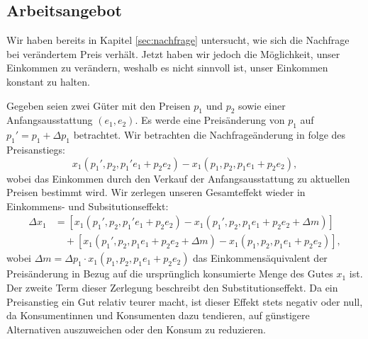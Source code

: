 \subsection{Arbeitsangebot}

Wir haben bereits in Kapitel \ref{sec:nachfrage} untersucht, wie sich die Nachfrage bei verändertem Preis verhält.
Jetzt haben wir jedoch die Möglichkeit, unser Einkommen zu verändern, weshalb es nicht sinnvoll ist, unser Einkommen konstant zu halten.

Gegeben seien zwei Güter mit den Preisen \(p_1\) und \(p_2\) sowie einer Anfangsausstattung \((e_1, e_2)\).
Es werde eine Preisänderung von \(p_1\) auf \(p_1' = p_1 + \Delta p_1\) betrachtet.
Wir betrachten die Nachfrageänderung in folge des Preisanstiegs:
\[
	x_1(p_1', p_2, p_1' e_1 + p_2 e_2) - x_1(p_1, p_2, p_1 e_1 + p_2 e_2),
\]
wobei das Einkommen durch den Verkauf der Anfangsausstattung zu aktuellen Preisen bestimmt wird.
Wir zerlegen unseren Gesamteffekt wieder in Einkommens- und Subsitutionseffekt:
\begin{align*}
	\Delta x_1 & = \left[x_1(p_1', p_2, p_1' e_1 + p_2 e_2) - x_1(p_1', p_2, p_1 e_1 + p_2 e_2 + \Delta m)\right]      \\
	           & \quad + \left[x_1(p_1', p_2, p_1 e_1 + p_2 e_2 + \Delta m) - x_1(p_1, p_2, p_1 e_1 + p_2 e_2)\right],
\end{align*}
wobei \(\Delta m = \Delta p_1 \cdot x_1(p_1, p_2, p_1 e_1 + p_2 e_2)\) das Einkommensäquivalent der Preisänderung in Bezug auf die ursprünglich konsumierte Menge des Gutes \(x_1\) ist.
Der zweite Term dieser Zerlegung beschreibt den Substitutionseffekt.
Da ein Preisanstieg ein Gut relativ teurer macht, ist dieser Effekt stets negativ oder null, da Konsumentinnen und Konsumenten dazu tendieren, auf günstigere Alternativen auszuweichen oder den Konsum zu reduzieren.

